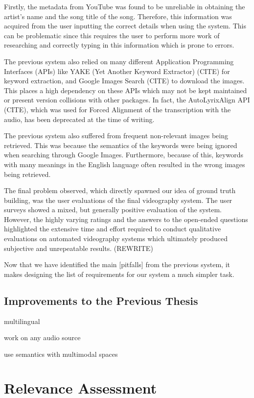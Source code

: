 \documentclass{l4proj}
\begin{document}
Firstly, the metadata from YouTube was found to be unreliable in obtaining the artist's name and the song title of the song. Therefore, this information was acquired from the user inputting the correct details when using the system. This can be problematic since this requires the user to perform more work of researching and correctly typing in this information which is prone to errors. 

The previous system also relied on many different Application Programming Interfaces (APIs) like YAKE (Yet Another Keyword Extractor) \cite{yake}(CITE) for keyword extraction, and Google Images Search \cite{google_images}(CITE) to download the images. This places a high dependency on these APIs which may not be kept maintained or present version collisions with other packages. In fact, the AutoLyrixAlign API \cite{autolyrixalign}(CITE), which was used for Forced Alignment of the transcription with the audio, has been deprecated at the time of writing.

The previous system also suffered from frequent non-relevant images being retrieved. This was because the semantics of the keywords were being ignored when searching through Google Images. Furthermore, because of this, keywords with many meanings in the English language often resulted in the wrong images being retrieved. 

The final problem observed, which directly spawned our idea of ground truth building, was the user evaluations of the final videography system. The user surveys showed a mixed, but generally positive evaluation of the system. However, the highly varying ratings and the answers to the open-ended questions highlighted the extensive time and effort required to conduct qualitative evaluations on automated videography systems which ultimately produced subjective and unrepeatable results. (REWRITE)

Now that we have identified the main [pitfalls] from the previous system, it makes designing the list of requirements for our system a much simpler task.

\subsection{Improvements to the Previous Thesis}
multilingual

work on any audio source

use semantics with multimodal spaces


\section{Relevance Assessment}
\end{document}
